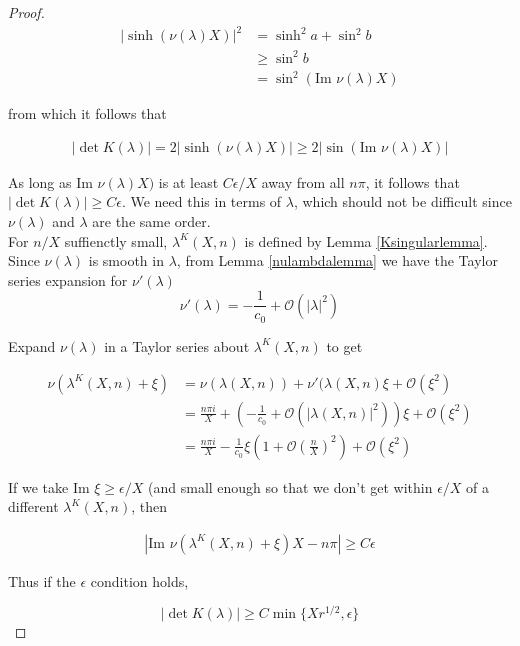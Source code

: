 \documentclass[thesis.tex]{subfiles}
\begin{document}
\begin{lemma}
\begin{proof}
\begin{align*}
|\sinh(\nu(\lambda) X)|^2 
&= \sinh^2 a + \sin^2 b \\
&\geq \sin^2 b \\
&= \sin^2 (\text{Im }\nu(\lambda)X)
\end{align*}

from which it follows that

\begin{align*}
|\det K(\lambda)| = 2 |\sinh(\nu(\lambda) X)| \geq 2|\sin(\text{Im }\nu(\lambda)X)|
\end{align*}

As long as $\text{Im }\nu(\lambda)X)$ is at least $C \epsilon/X$ away from all $n \pi$, it follows that $|\det K(\lambda)| \geq C \epsilon$. We need this in terms of $\lambda$, which should not be difficult since $\nu(\lambda)$ and $\lambda$ are the same order.\\

For $n/X$ suffienctly small, $\lambda^K(X, n)$ is defined by Lemma \ref{Ksingularlemma}. Since $\nu(\lambda)$ is smooth in $\lambda$, from Lemma \ref{nulambdalemma} we have the Taylor series expansion for $\nu'(\lambda)$
\[
\nu'(\lambda) = -\frac{1}{c_0} + \mathcal{O}(|\lambda|^2)
\]

Expand $\nu(\lambda)$ in a Taylor series about $\lambda^K(X, n)$ to get

\begin{align*}
\nu\left( \lambda^K(X, n) + \xi \right) &= \nu( \lambda(X, n) ) + \nu'(\lambda(X, n)\xi
+ \mathcal{O}(\xi^2) \\
&= \frac{n \pi i}{X} + \left( -\frac{1}{c_0} + \mathcal{O}(|\lambda(X, n)|^2) \right) \xi
+ \mathcal{O}(\xi^2) \\
&= \frac{n \pi i}{X} -\frac{1}{c_0}\xi \left( 1 + \mathcal{O} \left(\frac{n}{X}\right)^2 \right) + \mathcal{O}(\xi^2)
\end{align*}

If we take $\text{Im } \xi \geq \epsilon/X$ (and small enough so that we don't get within $\epsilon/X$ of a different $\lambda^K(X, n)$, then

\begin{align*}
|\text{Im } \nu\left( \lambda^K(X, n) + \xi \right)X - n \pi| \geq C \epsilon
\end{align*}

Thus if the $\epsilon$ condition holds,

\[
|\det K(\lambda)| \geq C \min\{ X r^{1/2}, \epsilon \}
\]

\end{proof}
\end{lemma}
\end{document}
